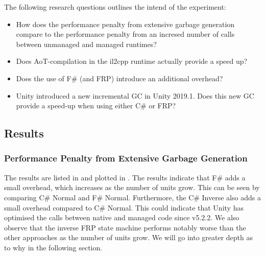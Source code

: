 The following research questions outlines the intend of the experiment:
\begin{itemize}
    \item How does the performance penalty from extensive garbage generation compare to the performance penalty from an incresed number of calls between unmanaged and managed runtimes?
    \item Does \gls{AoT}-compilation in the il2cpp runtime actually provide a speed up?
    \item Does the use of F\# (and \gls{FRP}) introduce an additional overhead?
    \item Unity introduced a new incremental \gls{GC} in Unity 2019.1. Does this new \gls{GC} provide a speed-up when using either C\# or \gls{FRP}?
\end{itemize}

\subsection{Results}
\metasheep

\subsubsection{Performance Penalty from Extensive Garbage Generation}
The results are listed in  and plotted in . The results indicate that F\# adds a small overhead, which increases as the number of units grow. This can be seen by comparing C\# Normal and F\# Normal. Furthermore, the C\# Inverse also adds a small overhead compared to C\# Normal. This could indicate that Unity has optimised the calls between native and managed code since v5.2.2. We also observe that the inverse FRP state machine performs notably worse than the other approaches as the number of units grow. We will go into greater depth as to why in the following section.

\begin{table}[H]
    \caption{Average framerate when simulating the given number of units in Unity's Mono runtime.}
    \label{tab:unity:ai}
\end{table}

